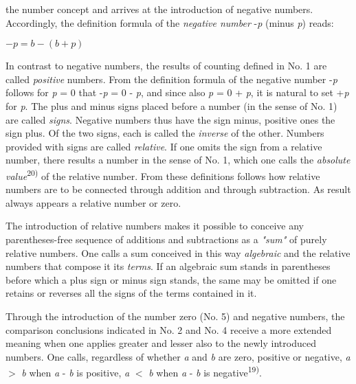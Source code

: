\thispagestyle{fancy}

\vspace{0.5cm}

 the number concept and arrives at the introduction of negative numbers. Accordingly, the definition formula of the \textit{negative number} -\textit{p} (minus \textit{p}) reads:

\vspace{-0.4cm}
\begin{center}
$- p = b - (b + p)$
\end{center}
\vspace{-0.3cm}

In contrast to negative numbers, the results of counting defined in No. 1 are called \textit{positive} numbers. From the definition formula of the negative number -\textit{p} follows for \textit{p} = 0 that -\textit{p} = 0 - \textit{p}, and since also \textit{p} = 0 + \textit{p}, it is natural to set +\textit{p} for \textit{p}. The plus and minus signs placed before a number (in the sense of No. 1) are called \textit{signs}. Negative numbers thus have the sign minus, positive ones the sign plus. Of the two signs, each is called the \textit{inverse} of the other. Numbers provided with signs are called \textit{relative}. If one omits the sign from a relative number, there results a number in the sense of No. 1, which one calls the \textit{absolute value}\textsuperscript{20)} of the relative number. From these definitions follows how relative numbers are to be connected through addition and through subtraction. As result always appears a relative number or zero.

The introduction of relative numbers makes it possible to conceive any parentheses-free sequence of additions and subtractions as a \textit{"sum"} of purely relative numbers. One calls a sum conceived in this way \textit{algebraic} and the relative numbers that compose it its \textit{terms}. If an algebraic sum stands in parentheses before which a plus sign or minus sign stands, the same may be omitted if one retains or reverses all the signs of the terms contained in it.

Through the introduction of the number zero (No. 5) and negative numbers, the comparison conclusions indicated in No. 2 and No. 4 receive a more extended meaning when one applies greater and lesser also to the newly introduced numbers. One calls, regardless of whether \textit{a} and \textit{b} are zero, positive or negative, \textit{a} $>$ \textit{b} when \textit{a} - \textit{b} is positive, \textit{a} $<$ \textit{b} when \textit{a} - \textit{b} is negative\textsuperscript{19)}.

